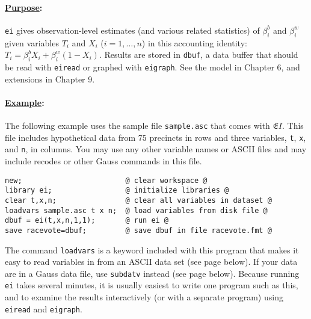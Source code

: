 \documentclass[11pt,titlepage]{article}
\newcommand{\EI}{\ensuremath{{\mathfrak EI}}}
\begin{document}
\paragraph{\underline{Purpose}:}
\texttt{ei} gives observation-level estimates (and various related
statistics) of $\beta^b_i$ and $\beta_i^w$ given variables $T_i$ and
$X_i$ ($i=1,\dots,n$) in this accounting identity: $T_i = \beta^b_iX_i
+ \beta^w_i(1-X_i)$.  Results are stored in \texttt{dbuf}, a data
buffer that should be read with \texttt{eiread} or graphed with
\texttt{eigraph}.  See the model in Chapter 6, and extensions in
Chapter 9.

\paragraph{\underline{Example}:}
The following example uses the sample file \texttt{sample.asc} that
comes with \EI.  This file includes hypothetical data from 75
precincts in rows and three variables, \texttt{t}, \texttt{x}, and
\texttt{n}, in columns.  You may use any other variable names or
ASCII files and may include recodes or other Gauss commands in this
file.
\begin{verbatim}
new;                        @ clear workspace @
library ei;                 @ initialize libraries @
clear t,x,n;                @ clear all variables in dataset @
loadvars sample.asc t x n;  @ load variables from disk file @
dbuf = ei(t,x,n,1,1);       @ run ei @
save racevote=dbuf;         @ save dbuf in file racevote.fmt @
\end{verbatim}
The command \texttt{loadvars} is a keyword included with this program
that makes it easy to read variables in from an ASCII data set (see
page \pageref{loadvars} below).  If your data are in a Gauss data
file, use \texttt{subdatv} instead (see page \pageref{subdatv} below).
Because running \texttt{ei} takes several minutes, it is usually
easiest to write one program such as this, and to examine the results
interactively (or with a separate program) using \texttt{eiread} and
\texttt{eigraph}.
\end{document}
